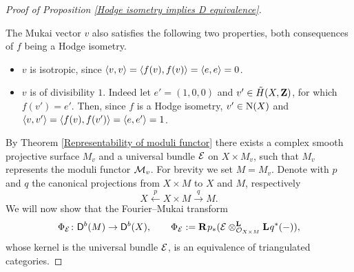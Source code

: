 \begin{proof}[Proof of Proposition \ref{Hodge isometry implies D equivalence}]
\begin{itemize}[label = $\circ$]
    \end{itemize} 
    The Mukai vector $v$ also satisfies the following two properties, both consequences of $f$ being a Hodge isometry.
    \begin{itemize}[label = $\circ$]
        \item{$v$ is isotropic, since $\pairing{v}{v} = \pairing{f(v)}{f(v)} = \pairing{e}{e} = 0$.}
        \item {$v$ is of divisibility $1$. Indeed let $e' = (1, 0, 0)$ and $v'\in \mukai{X}$, for which $f(v') = e'$. Then, since $f$ is a Hodge isometry, $v' \in \extendedNS{X}$ and $\pairing{v}{v'} = \pairing{f(v)}{f(v')} = \pairing{e}{e'} = 1$.
        }
    \end{itemize}
    By Theorem \ref{Representability of moduli functor} there exists a complex smooth projective surface $M_v$ and a universal bundle $\E$ on $X \times M_v$, such that $M_v$ represents the moduli functor $\M_v$. For brevity we set $M = M_v$. Denote with $p$ and $q$ the canonical projections from $X \times M$ to $X$ and $M$, respectively
    \[
        X \xleftarrow{\ p \ } X \times M \xrightarrow{\ q \ } M.
    \]
    We will now show that the Fourier--Mukai transform 
    \[
        \fm{\E} \colon \derb{M} \to \derb{X}, \qquad \fm{\E} := \rderived{}{p_*}(\derivedtensor{\E}{\lderived{}{q^*}(-)}{\struct{X \times M}}),
    \]
    whose kernel is the universal bundle $\E$, is an equivalence of triangulated categories. 


\end{proof}
